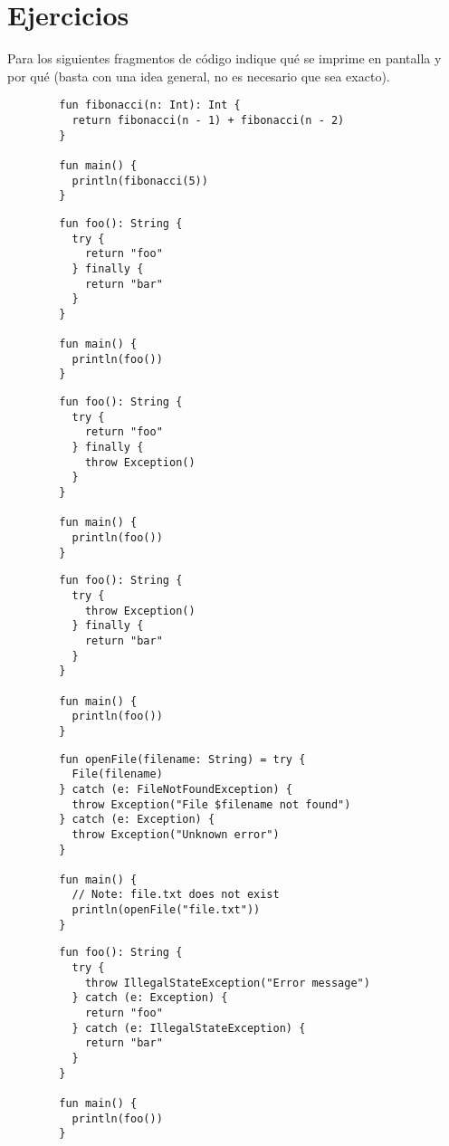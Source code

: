 \section{Ejercicios}
  \begin{Exercise}
    Para los siguientes fragmentos de código indique qué se imprime en pantalla y por qué 
    (basta con una idea general, no es necesario que sea exacto).

    \Question
      \begin{verbatim}
        fun fibonacci(n: Int): Int {
          return fibonacci(n - 1) + fibonacci(n - 2)
        }

        fun main() {
          println(fibonacci(5))
        }
      \end{verbatim}
    \Question
      \begin{verbatim}
        fun foo(): String {
          try {
            return "foo"
          } finally {
            return "bar"
          }
        }

        fun main() {
          println(foo())
        }
      \end{verbatim}
    \Question
      \begin{verbatim}
        fun foo(): String {
          try {
            return "foo"
          } finally {
            throw Exception()
          }
        }

        fun main() {
          println(foo())
        }
      \end{verbatim}
    \Question
      \begin{verbatim}
        fun foo(): String {
          try {
            throw Exception()
          } finally {
            return "bar"
          }
        }

        fun main() {
          println(foo())
        }
      \end{verbatim}
    \Question
      \begin{verbatim}
        fun openFile(filename: String) = try {
          File(filename)
        } catch (e: FileNotFoundException) {
          throw Exception("File $filename not found")
        } catch (e: Exception) {
          throw Exception("Unknown error")
        }

        fun main() {
          // Note: file.txt does not exist
          println(openFile("file.txt"))
        }
      \end{verbatim}
    \Question 
      \begin{verbatim}
        fun foo(): String {
          try {
            throw IllegalStateException("Error message")
          } catch (e: Exception) {
            return "foo"
          } catch (e: IllegalStateException) {
            return "bar"
          }
        }

        fun main() {
          println(foo())
        }
      \end{verbatim}
  \end{Exercise}